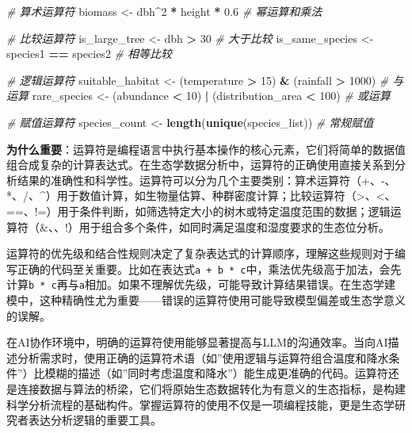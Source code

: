 \documentclass[
  twoside]{book}
\newenvironment{Shaded}{\begin{snugshade}}{\end{snugshade}}
\newcommand{\CommentTok}[1]{\textcolor[rgb]{0.56,0.35,0.01}{\textit{#1}}}
\newcommand{\DecValTok}[1]{\textcolor[rgb]{0.00,0.00,0.81}{#1}}
\newcommand{\FloatTok}[1]{\textcolor[rgb]{0.00,0.00,0.81}{#1}}
\newcommand{\FunctionTok}[1]{\textcolor[rgb]{0.13,0.29,0.53}{\textbf{#1}}}
\newcommand{\NormalTok}[1]{#1}
\newcommand{\OtherTok}[1]{\textcolor[rgb]{0.56,0.35,0.01}{#1}}
\newcommand{\SpecialCharTok}[1]{\textcolor[rgb]{0.81,0.36,0.00}{\textbf{#1}}}
\begin{document}
\begin{Shaded}
\begin{Highlighting}[]
\CommentTok{\# 算术运算符}
\NormalTok{biomass }\OtherTok{\textless{}{-}}\NormalTok{ dbh}\SpecialCharTok{\^{}}\DecValTok{2} \SpecialCharTok{*}\NormalTok{ height }\SpecialCharTok{*} \FloatTok{0.6}  \CommentTok{\# 幂运算和乘法}

\CommentTok{\# 比较运算符}
\NormalTok{is\_large\_tree }\OtherTok{\textless{}{-}}\NormalTok{ dbh }\SpecialCharTok{\textgreater{}} \DecValTok{30}  \CommentTok{\# 大于比较}
\NormalTok{is\_same\_species }\OtherTok{\textless{}{-}}\NormalTok{ species1 }\SpecialCharTok{==}\NormalTok{ species2  }\CommentTok{\# 相等比较}

\CommentTok{\# 逻辑运算符}
\NormalTok{suitable\_habitat }\OtherTok{\textless{}{-}}\NormalTok{ (temperature }\SpecialCharTok{\textgreater{}} \DecValTok{15}\NormalTok{) }\SpecialCharTok{\&}\NormalTok{ (rainfall }\SpecialCharTok{\textgreater{}} \DecValTok{1000}\NormalTok{)  }\CommentTok{\# 与运算}
\NormalTok{rare\_species }\OtherTok{\textless{}{-}}\NormalTok{ (abundance }\SpecialCharTok{\textless{}} \DecValTok{10}\NormalTok{) }\SpecialCharTok{|}\NormalTok{ (distribution\_area }\SpecialCharTok{\textless{}} \DecValTok{100}\NormalTok{)  }\CommentTok{\# 或运算}

\CommentTok{\# 赋值运算符}
\NormalTok{species\_count }\OtherTok{\textless{}{-}} \FunctionTok{length}\NormalTok{(}\FunctionTok{unique}\NormalTok{(species\_list))  }\CommentTok{\# 常规赋值}
\end{Highlighting}
\end{Shaded}

\textbf{为什么重要}：运算符是编程语言中执行基本操作的核心元素，它们将简单的数据值组合成复杂的计算表达式。在生态学数据分析中，运算符的正确使用直接关系到分析结果的准确性和科学性。运算符可以分为几个主要类别：算术运算符（+、-、*、/、\^{}）用于数值计算，如生物量估算、种群密度计算；比较运算符（\textgreater、\textless、==、!=）用于条件判断，如筛选特定大小的树木或特定温度范围的数据；逻辑运算符（\&、\textbar、!）用于组合多个条件，如同时满足温度和湿度要求的生态位分析。

运算符的优先级和结合性规则决定了复杂表达式的计算顺序，理解这些规则对于编写正确的代码至关重要。比如在表达式\texttt{a\ +\ b\ *\ c}中，乘法优先级高于加法，会先计算\texttt{b\ *\ c}再与\texttt{a}相加。如果不理解优先级，可能导致计算结果错误。在生态学建模中，这种精确性尤为重要------错误的运算符使用可能导致模型偏差或生态学意义的误解。

在AI协作环境中，明确的运算符使用能够显著提高与LLM的沟通效率。当向AI描述分析需求时，使用正确的运算符术语（如''使用逻辑与运算符组合温度和降水条件''）比模糊的描述（如''同时考虑温度和降水''）能生成更准确的代码。运算符还是连接数据与算法的桥梁，它们将原始生态数据转化为有意义的生态指标，是构建科学分析流程的基础构件。掌握运算符的使用不仅是一项编程技能，更是生态学研究者表达分析逻辑的重要工具。
\end{document}
